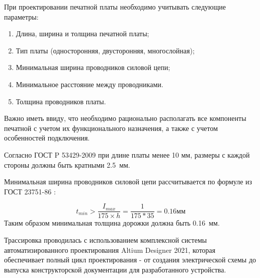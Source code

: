 При проектировании печатной платы необходимо учитывать следующие параметры:

\begin{enumerate}

	\item Длина, ширина и толщина печатной платы;
	
	\item Тип платы (односторонняя, двусторонняя, многослойная);
	\item Минимальная ширина проводников силовой цепи;
	
	\item Минимальное расстояние между проводниками.
	
	\item Толщина проводников платы.

\end{enumerate}

Важно иметь ввиду, что необходимо рационально располагать все компоненты печатной с учетом их функционального назначения, а также с учетом особенностей подключения. 

Согласно ГОСТ P 53429-2009 \cite{doc::Gost53429} при длине платы менее 10 мм, размеры с каждой стороны должны быть кратными 2.5~мм.

Минимальная ширина проводников силовой цепи рассчитывается по формуле из ГОСТ 23751-86 \cite{doc::Gost23751}:

\[
t_{min}>\frac{I_{max}}{175\times h} = \frac{1}{175*35} = 0.16 \text{мм}
\]
Таким образом минимальная толщина дорожки должна быть 0.16~мм.

Трассировка проводилась с использованием комплексной системы автоматизированного проектирования Altium Designer 2021, которая обеспечивает полный цикл проектирования - от создания электрической схемы до выпуска конструкторской документации для разработанного устройства.